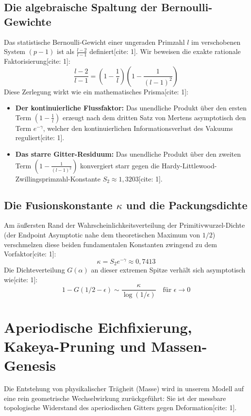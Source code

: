 \documentclass[11pt,a4paper]{article}
\begin{document}
	\subsection{Die algebraische Spaltung der Bernoulli-Gewichte}
	Das statistische Bernoulli-Gewicht einer ungeraden Primzahl $l$ im verschobenen System $(p-1)$ ist als $\frac{l-2}{l-1}$ definiert[cite: 1]. Wir beweisen die exakte rationale Faktorisierung[cite: 1]:
	\begin{equation}
		\frac{l-2}{l-1}=\left(1-\frac{1}{l}\right)\left(1-\frac{1}{(l-1)^{2}}\right)
	\end{equation}
	Diese Zerlegung wirkt wie ein mathematisches Prisma[cite: 1]:
	\begin{itemize}
		\item \textbf{Der kontinuierliche Flussfaktor:} Das unendliche Produkt über den ersten Term $\left(1-\frac{1}{l}\right)$ erzeugt nach dem dritten Satz von Mertens asymptotisch den Term $e^{-\gamma}$, welcher den kontinuierlichen Informationsverlust des Vakuums reguliert[cite: 1].
		\item \textbf{Das starre Gitter-Residuum:} Das unendliche Produkt über den zweiten Term $\left(1-\frac{1}{(l-1)^{2}}\right)$ konvergiert starr gegen die Hardy-Littlewood-Zwillingsprimzahl-Konstante $S_{2}\approx 1{,}3203$[cite: 1].
	\end{itemize}
	
	\subsection{Die Fusionskonstante $\kappa$ und die Packungsdichte}
	Am äußersten Rand der Wahrscheinlichkeitsverteilung der Primitivwurzel-Dichte (der Endpoint Asymptotic nahe dem theoretischen Maximum von $1/2$) verschmelzen diese beiden fundamentalen Konstanten zwingend zu dem Vorfaktor[cite: 1]:
	\begin{equation}
		\kappa=S_{2}e^{-\gamma}\approx 0{,}7413
	\end{equation}
	Die Dichteverteilung $G(\alpha)$ an dieser extremen Spitze verhält sich asymptotisch wie[cite: 1]:
	\begin{equation}
		1-G(1/2-\epsilon)\sim\frac{\kappa}{\log(1/\epsilon)} \quad \text{für } \epsilon \to 0
	\end{equation}
	
	\section{Aperiodische Eichfixierung, Kakeya-Pruning und Massen-Genesis}
	Die Entstehung von physikalischer Trägheit (Masse) wird in unserem Modell auf eine rein geometrische Wechselwirkung zurückgeführt: Sie ist der messbare topologische Widerstand des aperiodischen Gitters gegen Deformation[cite: 1].
	
\end{document}
